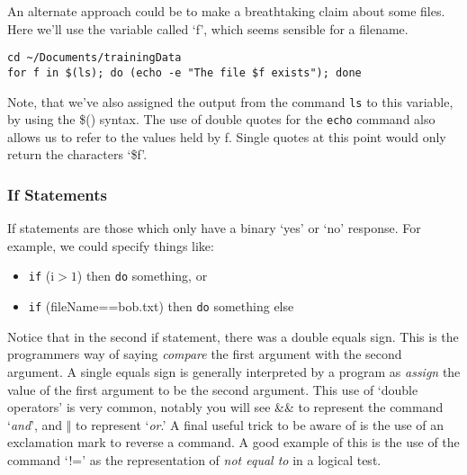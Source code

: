 \begin{advanced}
An alternate approach could be to make a breathtaking claim about some files.
Here we'll use the variable called `f', which seems sensible for a filename.
\begin{lstlisting}
cd ~/Documents/trainingData
for f in $(ls); do (echo -e "The file $f exists"); done
\end{lstlisting}
\end{advanced}

Note, that we've also assigned the output from the command \texttt{ls} to this variable, by using the \$() syntax.
The use of double quotes for the \texttt{echo} command also allows us to refer to the values held by f.
Single quotes at this point would only return the characters `\$f'.

\subsubsection{If Statements}
If statements are those which only have a binary `yes' or `no' response.
For example, we could specify things like:
\begin{itemize}
\item \texttt{if} (i$>1$) then \texttt{do} something, or
\item \texttt{if} (fileName==bob.txt) then \texttt{do} something else
\end{itemize}

\begin{information}
Notice that in the second if statement, there was a double equals sign.
This is the programmers way of saying \textit{compare} the first argument with the second argument.
A single equals sign is generally interpreted by a program as \textit{assign} the value of the first argument to be the second argument.
This use of `double operators' is very common, notably you will see \&\& to represent the command `\textit{and}', and $\Vert$ to represent `\textit{or}.'
A final useful trick to be aware of is the use of an exclamation mark to reverse a command.
A good example of this is the use of the command `!=' as the representation of \textit{not equal to} in a logical test.
\end{information}

